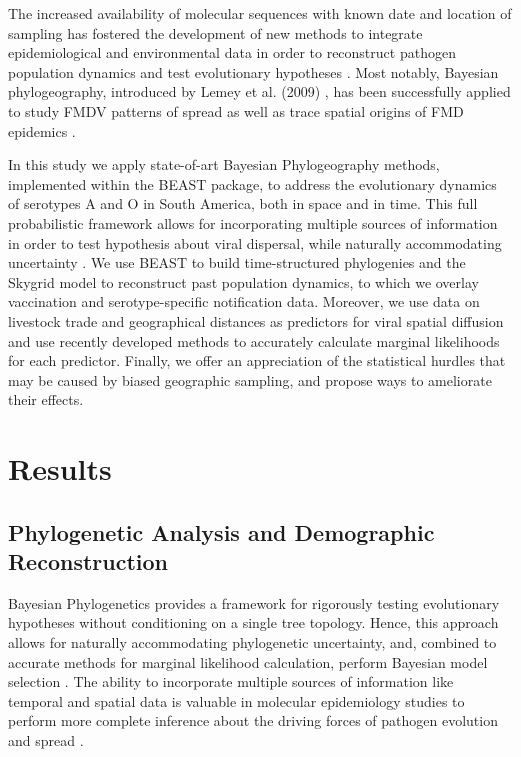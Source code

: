 \documentclass[10pt]{article}
\begin{document}
The increased availability of molecular sequences with known date and location of sampling has fostered the development of new methods to integrate epidemiological and environmental data in order to reconstruct pathogen population dynamics and test evolutionary hypotheses \cite{MEP,grenfell}. Most notably, Bayesian phylogeography, introduced by Lemey et al. (2009) \cite{roots}, has been successfully applied to study FMDV patterns of spread as well as trace spatial  origins of FMD epidemics \cite{Carvalho2012,bulgaria,phymal}.

In this study we apply state-of-art Bayesian Phylogeography methods, implemented within the BEAST \cite{BEAST} package, to address the evolutionary dynamics of serotypes A and O in South America, both in space and in time. This full probabilistic framework allows for incorporating multiple sources of information in order to test hypothesis about viral dispersal, while naturally accommodating uncertainty \cite{roots,towards}. We use BEAST to build time-structured phylogenies and the Skygrid \cite{skygrid} model to reconstruct past population dynamics, to which we overlay vaccination and serotype-specific notification data. Moreover, we use data on livestock trade and geographical distances as predictors for viral spatial diffusion and use recently developed methods to accurately calculate marginal likelihoods for each predictor. Finally, we offer an appreciation of the statistical hurdles that may be caused by biased geographic sampling, and propose ways to ameliorate their effects.



\section*{Results}



\subsection*{Phylogenetic Analysis and Demographic Reconstruction}

Bayesian Phylogenetics provides a framework for rigorously testing evolutionary hypotheses without conditioning on a single tree topology. Hence, this approach allows for naturally accommodating phylogenetic uncertainty, and, combined to accurate methods for marginal likelihood calculation, perform Bayesian model selection \cite{Baele2012,Baele2013a,Baele2013b}. The ability to incorporate multiple sources of information like temporal and spatial data is valuable in molecular epidemiology studies to perform more complete inference about the driving forces of pathogen evolution and spread \cite{towards,combining,MEP,roots}. 
\end{document}
